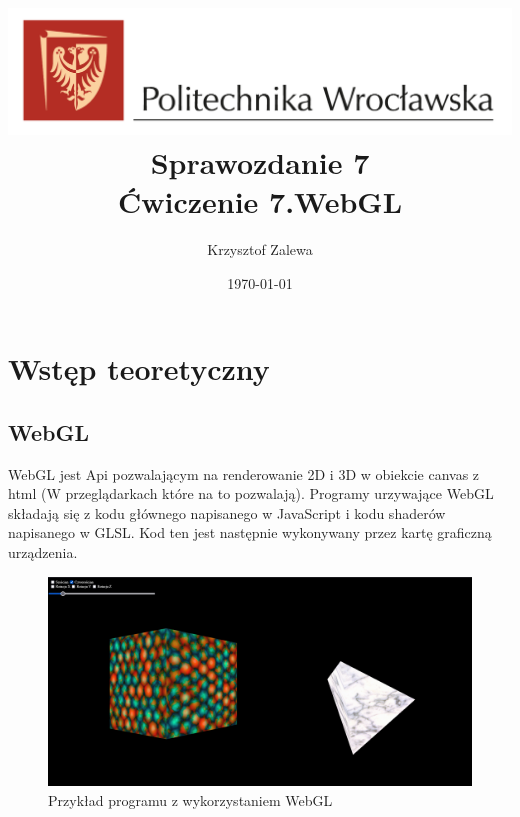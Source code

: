 \documentclass{article}
\title{
  \centering
  \includegraphics[width=\textwidth]{images/logo_PWr_kolor_poziom.png}\\
  \fontsize{28pt}{30pt}\selectfont Sprawozdanie 7\\
  \fontsize{14pt}{30pt}\selectfont Ćwiczenie 7.WebGL}
\author{Krzysztof Zalewa}
\date{\daymonthyear\today}
\begin{document}
    \maketitle
    \pagebreak
    \tableofcontents
    \FloatBarrier
    \section{Wstęp teoretyczny}
        \subsection{WebGL}
            \raggedright
            WebGL jest Api pozwalającym na renderowanie 2D i 3D w obiekcie canvas z html (W przeglądarkach które 
            na to pozwalają). Programy urzywające WebGL składają się z kodu głównego napisanego w JavaScript i 
            kodu shaderów napisanego w GLSL. Kod ten jest następnie wykonywany przez kartę graficzną urządzenia.
            \begin{figure}[ht]
                \centering
                \includegraphics[width=\textwidth]{images/WebGl.png}
                \caption{Przykład programu z wykorzystaniem WebGL}
                \label{fig:webgl}
            \end{figure}
            \FloatBarrier
\end{document}
